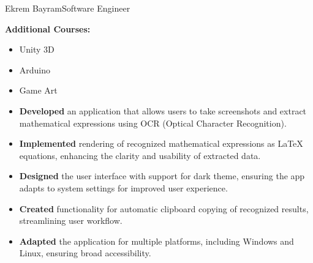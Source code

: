 \documentclass{article}
\begin{document}
\begin{cv}[avatar]{Ekrem Bayram}{Software Engineer}

    \begin{cvevent}[2021][present]
        \textbf{Additional Courses:}
        \begin{itemize}
            \item Unity 3D
            \item Arduino
            \item Game Art
        \end{itemize}
    \end{cvevent}



    \begin{cvevent}[2023]
        \begin{itemize}
            \item \textbf{Developed} an application that allows users to take screenshots and extract mathematical expressions using OCR (Optical Character Recognition).
            \item \textbf{Implemented} rendering of recognized mathematical expressions as LaTeX equations, enhancing the clarity and usability of extracted data.
            \item \textbf{Designed} the user interface with support for dark theme, ensuring the app adapts to system settings for improved user experience.
            \item \textbf{Created} functionality for automatic clipboard copying of recognized results, streamlining user workflow.
            \item \textbf{Adapted} the application for multiple platforms, including Windows and Linux, ensuring broad accessibility.
        \end{itemize}
    \end{cvevent}


\end{cv}
\end{document}
